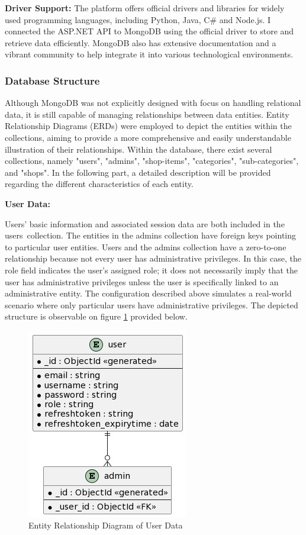\newpage

\textbf{Driver Support:} The platform offers official drivers and libraries for widely used programming languages, including Python, Java, C\# and Node.js. 
I connected the ASP.NET API to MongoDB using the official driver to store and retrieve data efficiently. MongoDB also has extensive documentation and a vibrant community to help integrate it into various technological environments. 
\newline \cite{mongodb}

\subsubsection{Database Structure}

Although MongoDB was not explicitly designed with focus on handling relational data, it is still capable of managing relationships between data entities. Entity Relationship Diagrams (ERDs) were employed to depict the entities within the collections, aiming to provide a more comprehensive and easily understandable illustration of their relationships. 
Within the database, there exist several collections, namely "users", "admins", "shop-items", "categories", "sub-categories", and "shops". In the following part, a detailed description will be provided regarding the different characteristics of each entity.

\noindent\textbf{User Data:} 

Users' basic information and associated session data are both included in the users collection. The entities in the admins collection have foreign keys pointing to particular user entities. Users and the admins collection have a zero-to-one relationship because not every user has administrative privileges. In this case, the role field indicates the user's assigned role; it does not necessarily imply that the user has administrative privileges unless the user is specifically linked to an administrative entity. The configuration described above simulates a real-world scenario where only particular users have administrative privileges. The depicted structure is observable on figure \ref{fig:uerd} provided below.

\begin{figure}[H]
	\centering
	\includegraphics[width=0.36\linewidth]{img/Users_erd.png}
	\caption{Entity Relationship Diagram of User Data}
	\label{fig:uerd}
\end{figure}


